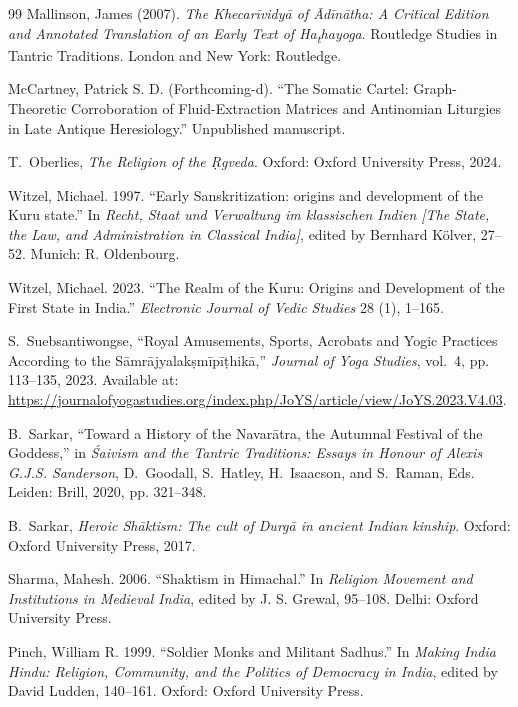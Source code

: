 \documentclass[11pt,twoside,letterpaper]{article}
\begin{document}
\begin{thebibliography}{99}
Mallinson, James (2007). \textit{The Khecarīvidyā of Ādīnātha: A Critical Edition and Annotated Translation of an Early Text of Ha\textsubscript{t}hayoga}. Routledge Studies in Tantric Traditions. London and New York: Routledge.

McCartney, Patrick S. D. (Forthcoming-d). 
\newblock ``The Somatic Cartel: Graph-Theoretic Corroboration of Fluid-Extraction Matrices and Antinomian Liturgies in Late Antique Heresiology.'' 
\newblock Unpublished manuscript.

T.~Oberlies, \textit{The Religion of the Ṛgveda}. Oxford: Oxford University Press, 2024.

Witzel, Michael. 1997. ``Early Sanskritization: origins and development of the Kuru state.'' In \textit{Recht, Staat und Verwaltung im klassischen Indien [The State, the Law, and Administration in Classical India]}, edited by Bernhard Kölver, 27–52. Munich: R. Oldenbourg.

Witzel, Michael. 2023. ``The Realm of the Kuru: Origins and Development of the First State in India.'' \textit{Electronic Journal of Vedic Studies} 28 (1), 1–165.

S.~Suebsantiwongse, ``Royal Amusements, Sports, Acrobats and Yogic Practices According to the Sāmrājyalakṣmīpīṭhikā,'' \textit{Journal of Yoga Studies}, vol.~4, pp. 113--135, 2023. Available at: \url{https://journalofyogastudies.org/index.php/JoYS/article/view/JoYS.2023.V4.03}.

B.~Sarkar, ``Toward a History of the Navarātra, the Autumnal Festival of the Goddess,'' in \textit{Śaivism and the Tantric Traditions: Essays in Honour of Alexis G.J.S. Sanderson}, D.~Goodall, S.~Hatley, H.~Isaacson, and S.~Raman, Eds. Leiden: Brill, 2020, pp. 321--348.

B.~Sarkar, \textit{Heroic Shāktism: The cult of Durgā in ancient Indian kinship}. Oxford: Oxford University Press, 2017.

Sharma, Mahesh. 2006. ``Shaktism in Himachal.'' In \textit{Religion Movement and Institutions in Medieval India}, edited by J. S. Grewal, 95–108. Delhi: Oxford University Press.

Pinch, William R. 1999. ``Soldier Monks and Militant Sadhus.'' In \textit{Making India Hindu: Religion, Community, and the Politics of Democracy in India}, edited by David Ludden, 140–161. Oxford: Oxford University Press.


\end{thebibliography}
\end{document}
